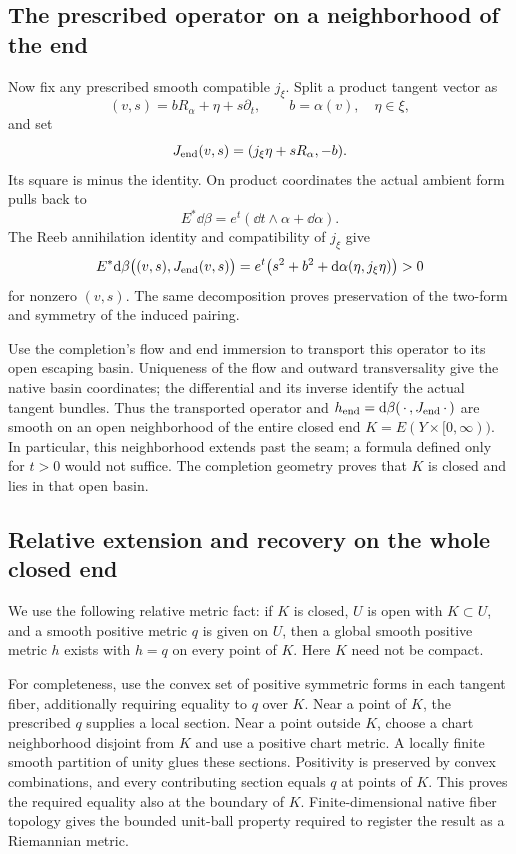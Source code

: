 \subsection{The prescribed operator on a neighborhood of the end}
Now fix any prescribed smooth compatible $j_\xi$. Split a product
tangent vector as
\[
 (v,s)=bR_\alpha+\eta+s\partial_t,\qquad
 b=\alpha(v),\quad\eta\in\xi,
\]
and set
\[
 J_{\rm end}(v,s)=(j_\xi\eta+sR_\alpha,-b).
\]
Its square is minus the identity. On product coordinates the actual
ambient form pulls back to
\[
 E^*\dd\beta=e^t(\dd t\wedge\alpha+\dd\alpha).
\]
The Reeb annihilation identity and compatibility of $j_\xi$ give
\[
 E^*\mathrm d\beta\bigl((v,s),J_{\rm end}(v,s)\bigr)
 =e^t\bigl(s^2+b^2+\mathrm d\alpha(\eta,j_\xi\eta)\bigr)>0
\]
for nonzero $(v,s)$. The same decomposition proves preservation of
the two-form and symmetry of the induced pairing.

Use the completion's flow and end immersion to transport this operator
to its open escaping basin. Uniqueness of the flow and outward
transversality give the native basin coordinates; the differential
and its inverse identify the actual tangent bundles. Thus the
transported operator and
$h_{\rm end}=\mathrm d\beta(\,\cdot\,,J_{\rm end}\,\cdot\,)$ are smooth
on an open neighborhood of the entire closed end
$K=E(Y\times[0,\infty))$. In particular, this neighborhood extends
past the seam; a formula defined only for $t>0$ would not suffice.
The completion geometry proves that $K$ is closed and lies in that
open basin.

\subsection{Relative extension and recovery on the whole closed end}
We use the following relative metric fact: if $K$ is closed, $U$ is
open with $K\subset U$, and a smooth positive metric $q$ is given
on $U$, then a global smooth positive metric $h$ exists with $h=q$
on every point of $K$. Here $K$ need not be compact.

For completeness, use the convex set of positive symmetric forms in
each tangent fiber, additionally requiring equality to $q$ over $K$.
Near a point of $K$, the prescribed $q$ supplies a local section.
Near a point outside $K$, choose a chart neighborhood disjoint from
$K$ and use a positive chart metric. A locally finite smooth
partition of unity glues these sections. Positivity is preserved by
convex combinations, and every contributing section equals $q$ at
points of $K$. This proves the required equality also at the boundary
of $K$. Finite-dimensional native fiber topology gives the bounded
unit-ball property required to register the result as a Riemannian
metric.


